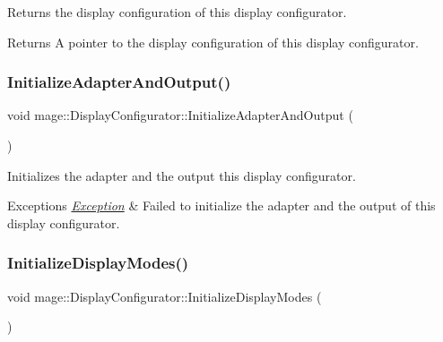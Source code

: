 Returns the display configuration of this display configurator.

\begin{DoxyReturn}{Returns}
A pointer to the display configuration of this display configurator. 
\end{DoxyReturn}
\hypertarget{classmage_1_1_display_configurator_a03fd2c38f6fdb6fbc8ff429a7d0d2a89}{}\label{classmage_1_1_display_configurator_a03fd2c38f6fdb6fbc8ff429a7d0d2a89} 
\subsubsection{\texorpdfstring{Initialize\+Adapter\+And\+Output()}{InitializeAdapterAndOutput()}}
{\footnotesize\ttfamily void mage\+::\+Display\+Configurator\+::\+Initialize\+Adapter\+And\+Output (\begin{DoxyParamCaption}{ }\end{DoxyParamCaption})\hspace{0.3cm}{\ttfamily [private]}}

Initializes the adapter and the output this display configurator.


\begin{DoxyExceptions}{Exceptions}
{\em \hyperlink{classmage_1_1_exception}{Exception}} & Failed to initialize the adapter and the output of this display configurator. \\
\hline
\end{DoxyExceptions}
\hypertarget{classmage_1_1_display_configurator_a90ecffb8d93768464bb1698531a34db7}{}\label{classmage_1_1_display_configurator_a90ecffb8d93768464bb1698531a34db7} 
\subsubsection{\texorpdfstring{Initialize\+Display\+Modes()}{InitializeDisplayModes()}}
{\footnotesize\ttfamily void mage\+::\+Display\+Configurator\+::\+Initialize\+Display\+Modes (\begin{DoxyParamCaption}{ }\end{DoxyParamCaption})\hspace{0.3cm}{\ttfamily [private]}}

